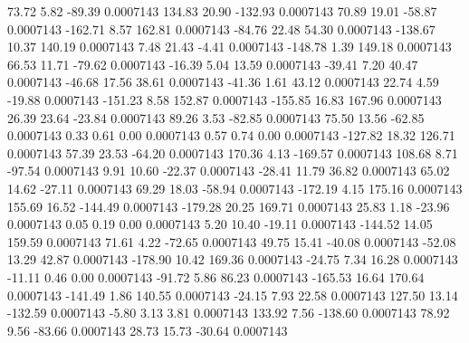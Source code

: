        73.72        5.82      -89.39     0.0007143
      134.83       20.90     -132.93     0.0007143
       70.89       19.01      -58.87     0.0007143
     -162.71        8.57      162.81     0.0007143
      -84.76       22.48       54.30     0.0007143
     -138.67       10.37      140.19     0.0007143
        7.48       21.43       -4.41     0.0007143
     -148.78        1.39      149.18     0.0007143
       66.53       11.71      -79.62     0.0007143
      -16.39        5.04       13.59     0.0007143
      -39.41        7.20       40.47     0.0007143
      -46.68       17.56       38.61     0.0007143
      -41.36        1.61       43.12     0.0007143
       22.74        4.59      -19.88     0.0007143
     -151.23        8.58      152.87     0.0007143
     -155.85       16.83      167.96     0.0007143
       26.39       23.64      -23.84     0.0007143
       89.26        3.53      -82.85     0.0007143
       75.50       13.56      -62.85     0.0007143
        0.33        0.61        0.00     0.0007143
        0.57        0.74        0.00     0.0007143
     -127.82       18.32      126.71     0.0007143
       57.39       23.53      -64.20     0.0007143
      170.36        4.13     -169.57     0.0007143
      108.68        8.71      -97.54     0.0007143
        9.91       10.60      -22.37     0.0007143
      -28.41       11.79       36.82     0.0007143
       65.02       14.62      -27.11     0.0007143
       69.29       18.03      -58.94     0.0007143
     -172.19        4.15      175.16     0.0007143
      155.69       16.52     -144.49     0.0007143
     -179.28       20.25      169.71     0.0007143
       25.83        1.18      -23.96     0.0007143
        0.05        0.19        0.00     0.0007143
        5.20       10.40      -19.11     0.0007143
     -144.52       14.05      159.59     0.0007143
       71.61        4.22      -72.65     0.0007143
       49.75       15.41      -40.08     0.0007143
      -52.08       13.29       42.87     0.0007143
     -178.90       10.42      169.36     0.0007143
      -24.75        7.34       16.28     0.0007143
      -11.11        0.46        0.00     0.0007143
      -91.72        5.86       86.23     0.0007143
     -165.53       16.64      170.64     0.0007143
     -141.49        1.86      140.55     0.0007143
      -24.15        7.93       22.58     0.0007143
      127.50       13.14     -132.59     0.0007143
       -5.80        3.13        3.81     0.0007143
      133.92        7.56     -138.60     0.0007143
       78.92        9.56      -83.66     0.0007143
       28.73       15.73      -30.64     0.0007143
